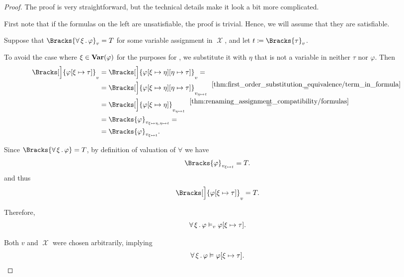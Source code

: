 \begin{proof}
  The proof is very straightforward, but the technical details make it look a bit more complicated.

  First note that if the formulas on the left are unsatisfiable, the proof is trivial. Hence, we will assume that they are satisfiable.

   Suppose that \( \Bracks{\qforall \xi \varphi}_v = T \) for some variable assignment in \( \mscrX \), and let \( t \coloneqq \Bracks{\tau}_v \).

  To avoid the case where \( \xi \in \operatorname{\mathbf{Var}}(\varphi) \) for the purposes for , we substitute it with \( \eta \) that is not a variable in neither \( \tau \) nor \( \varphi \). Then
  \begin{align*}
    \Bracks[\Big]{\varphi[\xi \mapsto \tau]}_v
    &=
    \Bracks[\Big]{\varphi[\xi \mapsto \eta][\eta \mapsto \tau]}_v
    = \\ &=
    \Bracks[\Big]{\varphi[\xi \mapsto \eta][\eta \mapsto \tau]}_{v_{\eta \mapsto t}}
    \reloset {\ref{thm:first_order_substitution_equivalence/term_in_formula}} = \\ &=
    \Bracks[\Big]{\varphi[\xi \mapsto \eta]}_{v_{\eta \mapsto t}}
    \reloset {\ref{thm:renaming_assignment_compatibility/formulas}} = \\ &=
    \Bracks{\varphi}_{v_{\xi \mapsto \eta, \eta \mapsto t}}
    = \\ &=
    \Bracks{\varphi}_{v_{\xi \mapsto t}}.
  \end{align*}

  Since \( \Bracks{\qforall \xi \varphi} = T \), by definition of valuation of \( \forall \) we have
  \begin{equation*}
    \Bracks{\varphi}_{v_{\xi \mapsto t}} = T.
  \end{equation*}
  and thus
  \begin{equation*}
    \Bracks[\Big]{\varphi[\xi \mapsto \tau]}_v = T.
  \end{equation*}

  Therefore,
  \begin{equation*}
    \forall \thinspace \xi \thinspace . \thinspace \varphi \vDash_v \varphi[\xi \mapsto \tau].
  \end{equation*}

  Both \( v \) and \( \mscrX \) were chosen arbitrarily, implying
  \begin{equation*}
    \forall \thinspace \xi \thinspace . \thinspace \varphi \vDash \varphi[\xi \mapsto \tau].
  \end{equation*}


\end{proof}
